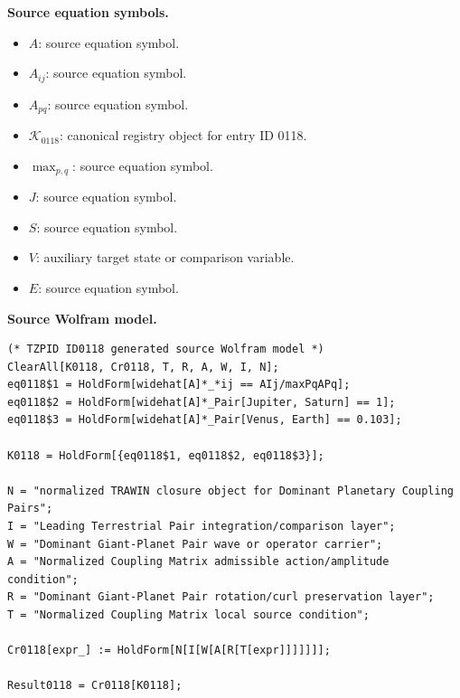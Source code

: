 \begin{minipage}[t]{0.49\linewidth}
\begingroup
\small
\raggedright
\textbf{Source equation symbols.}\par
\begin{itemize}[leftmargin=1.35em,itemsep=1pt,topsep=1pt,parsep=0pt]
    \item $A$: source equation symbol.
    \item $A_{ij}$: source equation symbol.
    \item $A_{pq}$: source equation symbol.
    \item $\mathcal{K}_{0118}$: canonical registry object for entry ID 0118.
    \item $\max_{p,q}$: source equation symbol.
    \item $J$: source equation symbol.
    \item $S$: source equation symbol.
    \item $V$: auxiliary target state or comparison variable.
    \item $E$: source equation symbol.
\end{itemize}
\endgroup
\end{minipage}\hfill
\begin{minipage}[t]{0.47\linewidth}
\begingroup
\scriptsize
\raggedright
\textbf{Source Wolfram model.}\par
\begin{Verbatim}[fontsize=\tiny,breaklines=true,breakanywhere=true]
(* TZPID ID0118 generated source Wolfram model *)
ClearAll[K0118, Cr0118, T, R, A, W, I, N];
eq0118$1 = HoldForm[widehat[A]*_*ij == AIj/maxPqAPq];
eq0118$2 = HoldForm[widehat[A]*_Pair[Jupiter, Saturn] == 1];
eq0118$3 = HoldForm[widehat[A]*_Pair[Venus, Earth] == 0.103];

K0118 = HoldForm[{eq0118$1, eq0118$2, eq0118$3}];

N = "normalized TRAWIN closure object for Dominant Planetary Coupling Pairs";
I = "Leading Terrestrial Pair integration/comparison layer";
W = "Dominant Giant-Planet Pair wave or operator carrier";
A = "Normalized Coupling Matrix admissible action/amplitude condition";
R = "Dominant Giant-Planet Pair rotation/curl preservation layer";
T = "Normalized Coupling Matrix local source condition";

Cr0118[expr_] := HoldForm[N[I[W[A[R[T[expr]]]]]]];

Result0118 = Cr0118[K0118];
\end{Verbatim}
\endgroup
\end{minipage}

